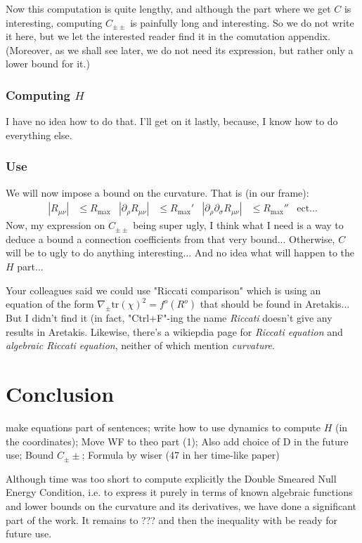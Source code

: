 \documentclass[a4paper,11pt]{article}
\numberwithin{equation}{section}
\theoremstyle{definition}
\begin{document}
Now this computation is quite lengthy, and although the part where we get $C$ is interesting, computing $C_{\pm\pm}$ is painfully long and interesting. So we do not write it here, but we let the interested reader find it in the comutation appendix. (Moreover, as we shall see later, we do not need its expression, but rather only a lower bound for it.)


\subsubsection{Computing $H$}
\color{red} I have no idea how to do that. I'll get on it lastly, because, I know how to do everything else. \color{black}
\subsubsection{Use}
We will now impose a bound on the curvature. That is (in our frame):
\begin{align}
    |R_{\mu\nu}| &\leq R_\mathrm{max}&
    |\partial_\rho R_{\mu\nu}| &\leq
    R_\mathrm{max}'&
    |\partial_\rho\partial_\sigma
    R_{\mu\nu}| & \leq R_\mathrm{max}''&
    \mathrm{ect}...
\end{align}
\color{red} Now, my expression on $C_{\pm\pm}$ being super ugly, I think what I need is a way to deduce a bound a connection coefficients from that very bound... Otherwise, $C$ will be to ugly to do anything interesting... And no idea what will happen to the $H$ part... 

Your colleagues said we could use "Riccati comparison" which is using an equation of the form $\nabla_\pm \mathrm{tr}(\chi)^2 = f^o(R^o)$ that should be found in Aretakis... But I didn't find it (in fact, "Ctrl+F"-ing the name \emph{Riccati} doesn't  give any results in Aretakis. Likewise, there's a wikiepdia page for \emph{Riccati equation} and \emph{algebraic Riccati equation}, neither of which mention \emph{curvature}. \color{black}

\section{Conclusion}
\color{red} make equations part of sentences;
write how to use dynamics to compute $H$ (in the coordinates);
Move WF to theo part (1);
Also add choice of D in the future use;
Bound $C_\pm\pm$;
Formula by wiser (47 in her time-like paper)\color{black}

Although time was too short to compute explicitly the Double Smeared Null Energy Condition, i.e. to express it purely in terms of known algebraic functions and lower bounds on the curvature and its derivatives, we have done a significant part of the work. It remains to \color{red} ??? \color{black} and then the inequality with be ready for future use.
\end{document}
